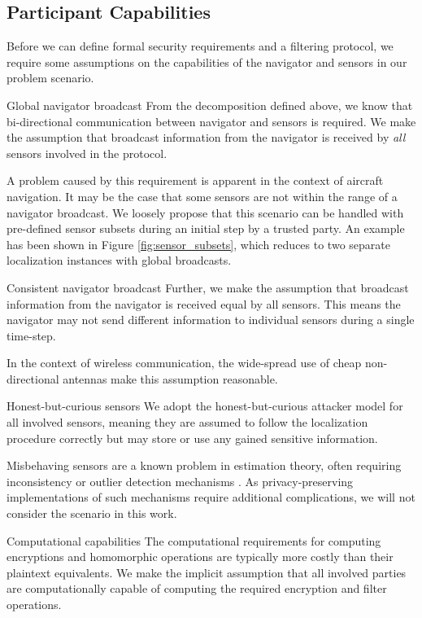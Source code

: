 \documentclass[10pt,letterpaper,oneside,twocolumn,journal]{IEEEtran}
\theoremstyle{definition}
\theoremstyle{definition}
\theoremstyle{remark}
\begin{document}
\subsection{Participant Capabilities} \label{subsec:capabilities}
Before we can define formal security requirements and a filtering protocol, we require some assumptions on the capabilities of the navigator and sensors in our problem scenario.
\begin{LaTeXdescription}
    \item[Global navigator broadcast] From the decomposition defined above, we know that bi-directional communication between navigator and sensors is required. We make the assumption that broadcast information from the navigator is received by \textit{all} sensors involved in the protocol.
    
    A problem caused by this requirement is apparent in the context of aircraft navigation. It may be the case that some sensors are not within the range of a navigator broadcast. We loosely propose that this scenario can be handled with pre-defined sensor subsets during an initial step by a trusted party. An example has been shown in Figure \ref{fig:sensor_subsets}, which reduces to two separate localization instances with global broadcasts.
    \item[Consistent navigator broadcast] Further, we make the assumption that broadcast information from the navigator is received equal by all sensors. This means the navigator may not send different information to individual sensors during a single time-step.
    
    In the context of wireless communication, the wide-spread use of cheap non-directional antennas make this assumption reasonable.
    \item[Honest-but-curious sensors] We adopt the honest-but-curious attacker model for all involved sensors, meaning they are assumed to follow the localization procedure correctly but may store or use any gained sensitive information. 
    
    Misbehaving sensors are a known problem in estimation theory, often requiring inconsistency or outlier detection mechanisms \cite{lazosSeRLocSecureRangeindependent2004,ben-galOutlierDetection2005}. As privacy-preserving implementations of such mechanisms require additional complications, we will not consider the scenario in this work.
    \item[Computational capabilities] The computational requirements for computing encryptions and homomorphic operations are typically more costly than their plaintext equivalents. We make the implicit assumption that all involved parties are computationally capable of computing the required encryption and filter operations.
\end{LaTeXdescription}
\end{document}
